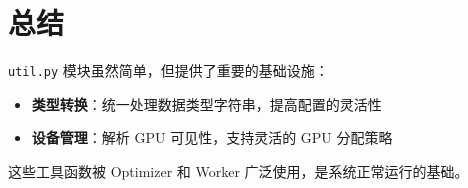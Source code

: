 \documentclass[12pt,a4paper]{article}
\begin{document}
\section{总结}

\texttt{util.py} 模块虽然简单，但提供了重要的基础设施：

\begin{itemize}
    \item \textbf{类型转换}：统一处理数据类型字符串，提高配置的灵活性
    \item \textbf{设备管理}：解析 GPU 可见性，支持灵活的 GPU 分配策略
\end{itemize}

这些工具函数被 Optimizer 和 Worker 广泛使用，是系统正常运行的基础。
\end{document}
